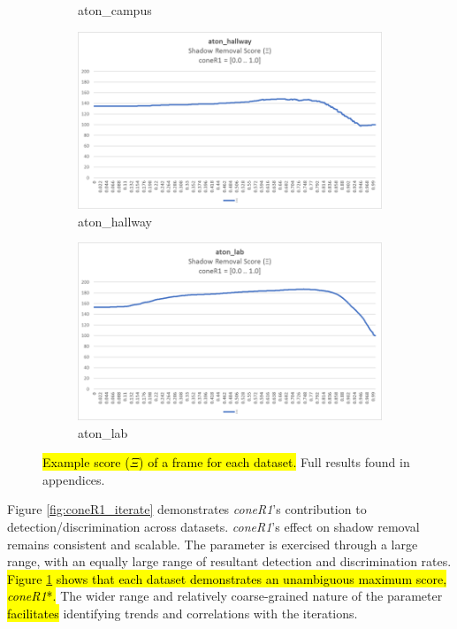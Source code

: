 \begin{figure}
\begin{subfigure}{.45\linewidth}
  \caption{aton\_campus}
\end{subfigure}
\hfill
\begin{subfigure}{.45\linewidth}
  \includegraphics[width=1\linewidth]{figures/hallway_coneR1_score.jpg}
  \caption{aton\_hallway}
\end{subfigure}
\hfill
\begin{subfigure}{.45\linewidth}
  \includegraphics[width=1\linewidth]{figures/lab_coneR1_score.jpg}
  \caption{aton\_lab}
\end{subfigure}

\caption{\hl{Example score ($\Xi$) of a frame for each dataset. }Full results found in appendices.}
\label{fig:coneR1_iterate_score}
\end{figure}

Figure \ref{fig:coneR1_iterate} demonstrates \textit{coneR1}'s contribution to detection/discrimination across datasets. \textit{coneR1}'s effect on shadow removal remains consistent and scalable. The parameter is exercised through a large range, with an equally large range of resultant detection and discrimination rates. \hl{Figure \ref{fig:coneR1_iterate_score} shows that each dataset demonstrates an unambiguous maximum score, \textit{coneR1}*.} The wider range and relatively coarse-grained nature of the parameter \hl{facilitates} identifying trends and correlations with the iterations.

